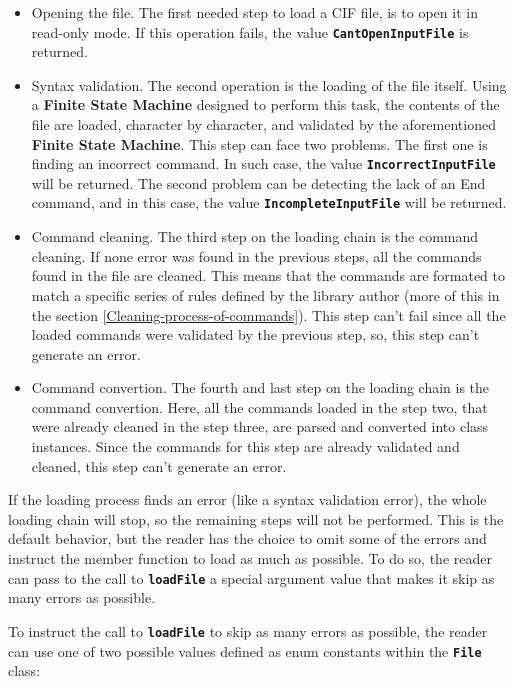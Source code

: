 \documentclass[11pt,twoside,openany,x11names,svgnames]{memoir}
\begin{document}
\begin{itemize}
	\item Opening the file. The first needed step to load a CIF file, is to open it in read-only mode. If this operation fails, the value \textbf{\texttt{CantOpenInputFile}} is returned.
	
	\item Syntax validation. The second operation is the loading of the file itself. Using a  \textbf{Finite State Machine} designed to perform this task, the contents of the file are loaded, character by character, and validated by the aforementioned \textbf{Finite State Machine}. This step can face two problems. The first one is finding an incorrect command. In such case, the value \textbf{\texttt{IncorrectInputFile}} will be returned. The second problem can be detecting the lack of an End command, and in this case, the value \textbf{\texttt{IncompleteInputFile}} will be returned.
	
	\item Command cleaning. The third step on the loading chain is the command cleaning. If none error was found in the previous steps, all the commands found in the file are cleaned. This means that the commands are formated to match a specific series of rules defined by the library author (more of this in the section \ref{Cleaning-process-of-commands}). This step can't fail since all the loaded commands were validated by the previous step, so, this step can't generate an error.
	
	\item Command convertion. The fourth and last step on the loading chain is the command convertion. Here, all the commands loaded in the step two, that were already cleaned in the step three, are parsed and converted into class instances. Since the commands for this step are already validated and cleaned, this step can't generate an error.
\end{itemize}

If the loading process finds an error (like a syntax validation error), the whole loading chain will stop, so the remaining steps will not be performed. This is the default behavior, but the reader has the choice to omit some of the errors and instruct the member function to load as much as possible. To do so, the reader can pass to the call to \textbf{\texttt{loadFile}} a special argument value that makes it skip as many errors as possible.

To instruct the call to \textbf{\texttt{loadFile}} to skip as many errors as possible, the reader can use one of two possible values defined as enum constants within the \textbf{\texttt{File}} class:
\end{document}
